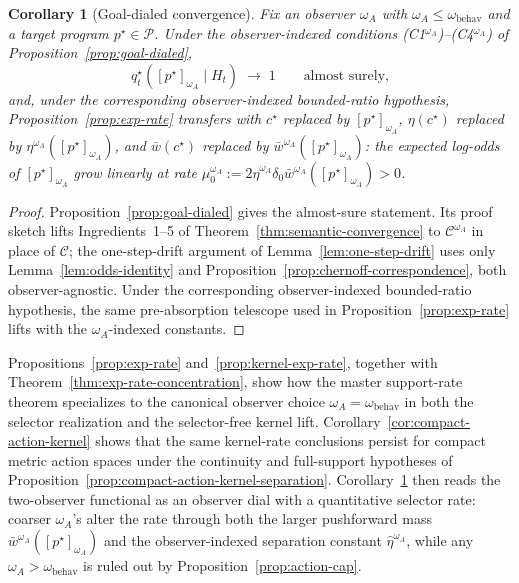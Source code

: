 \documentclass[11pt]{article}
\newtheorem{corollary}[theorem]{Corollary}
\theoremstyle{definition}
\theoremstyle{remark}
\newcommand{\Ccal}{\mathcal{C}}
\newcommand{\Pcal}{\mathcal{P}}
\begin{document}
\begin{corollary}[Goal-dialed convergence]
\label{cor:goal-dialed-payoff}
Fix an observer $\omega_A$ with $\omega_A\le\omega_{\mathrm{behav}}$ and a target program $p^\star\in\Pcal$. Under the observer-indexed conditions \textup{(C1$^{\omega_A}$)--(C4$^{\omega_A}$)} of Proposition~\ref{prop:goal-dialed},
\[
q_t^\star([p^\star]_{\omega_A}\mid H_t)\;\longrightarrow\;1
\qquad\text{almost surely,}
\]
and, under the corresponding observer-indexed bounded-ratio hypothesis, Proposition~\ref{prop:exp-rate} transfers with $c^\star$ replaced by $[p^\star]_{\omega_A}$, $\eta(c^\star)$ replaced by $\eta^{\omega_A}([p^\star]_{\omega_A})$, and $\bar w(c^\star)$ replaced by $\bar w^{\omega_A}([p^\star]_{\omega_A})$: the expected log-odds of $[p^\star]_{\omega_A}$ grow linearly at rate $\mu_0^{\omega_A}:=2\hat\eta^{\omega_A}\delta_0\bar w^{\omega_A}([p^\star]_{\omega_A})>0$.
\end{corollary}

\begin{proof}
Proposition~\ref{prop:goal-dialed} gives the almost-sure statement. Its proof sketch lifts Ingredients~1--5 of Theorem~\ref{thm:semantic-convergence} to $\Ccal^{\omega_A}$ in place of $\Ccal$; the one-step-drift argument of Lemma~\ref{lem:one-step-drift} uses only Lemma~\ref{lem:odds-identity} and Proposition~\ref{prop:chernoff-correspondence}, both observer-agnostic. Under the corresponding observer-indexed bounded-ratio hypothesis, the same pre-absorption telescope used in Proposition~\ref{prop:exp-rate} lifts with the $\omega_A$-indexed constants.
\end{proof}

Propositions~\ref{prop:exp-rate} and~\ref{prop:kernel-exp-rate}, together with Theorem~\ref{thm:exp-rate-concentration}, show how the master support-rate theorem specializes to the canonical observer choice $\omega_A=\omega_{\mathrm{behav}}$ in both the selector realization and the selector-free kernel lift. Corollary~\ref{cor:compact-action-kernel} shows that the same kernel-rate conclusions persist for compact metric action spaces under the continuity and full-support hypotheses of Proposition~\ref{prop:compact-action-kernel-separation}. Corollary~\ref{cor:goal-dialed-payoff} then reads the two-observer functional as an observer dial with a quantitative selector rate: coarser $\omega_A$'s alter the rate through both the larger pushforward mass $\bar w^{\omega_A}([p^\star]_{\omega_A})$ and the observer-indexed separation constant $\hat\eta^{\omega_A}$, while any $\omega_A>\omega_{\mathrm{behav}}$ is ruled out by Proposition~\ref{prop:action-cap}.
\end{document}
